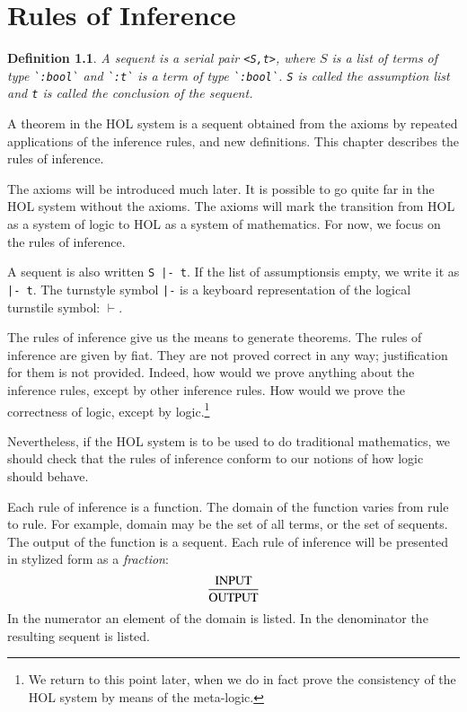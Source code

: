 \documentclass[cup9a]{cupbook}
\newtheorem{definition}{Definition}[chapter]
\begin{document}
\chapter{Rules of Inference}

\begin{definition}
A sequent is a serial pair \verb!<S,t>!, where $S$ is a list of terms of type \verb!`:bool`! and \verb!`:t`! is a term of type \verb!`:bool`!.
\verb!S! is called the assumption list and \verb!t! is called the conclusion of the sequent.
\end{definition}

A theorem in the HOL system is a sequent obtained from the axioms by repeated applications of the inference rules, and new definitions.  This chapter describes the rules of inference.

The axioms will be introduced much later.  It is possible to go quite far in the HOL system without the axioms.  The axioms will mark the transition from HOL as a system of logic to HOL as a system of mathematics.  For now, we focus on the rules of inference.

A sequent is also written \verb!S |- t!.  If the list of assumptionsis empty, we write it as \verb!|- t!.  The turnstyle symbol \verb!|-! is a keyboard representation of the logical turnstile symbol: $\vdash$.



The rules of inference give us the means to generate theorems.
The rules of inference are given by fiat.  They are not proved correct in any way; justification for them is not provided.  Indeed, how would we prove anything about the inference rules, except by other inference rules.  How would we prove the correctness of logic, except by logic.\footnote{We return to this point later, when we do in fact prove the consistency of the HOL system by means of the meta-logic.}

Nevertheless, if the HOL system is to be used to do traditional mathematics, we should check that the rules of inference conform to our notions of how logic should behave.

Each rule of inference is a function.  The domain of the function varies from rule to rule.  For example, domain may be the set of all terms, or the set of sequents.   The output of the function is a sequent.  Each rule of inference will be presented in stylized form as a {\it fraction}:
$$
\frac{\hbox{INPUT}}{\hbox{OUTPUT}}
$$
In the numerator an element of the domain is listed.  In the denominator the resulting sequent is listed.  
\end{document}

